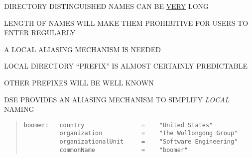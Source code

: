\begin{bwslide}

\begin{nrtc}
\item	DIRECTORY DISTINGUISHED NAMES CAN BE \underline{VERY} LONG
	\begin{nrtc}
	\item	LENGTH OF NAMES WILL MAKE THEM PROHIBITIVE FOR USERS TO ENTER REGULARLY
	\end{nrtc}
\item	A LOCAL ALIASING MECHANISM IS NEEDED
	\begin{nrtc}
	\item	LOCAL DIRECTORY ``PREFIX'' IS ALMOST CERTAINLY PREDICTABLE
	\item	OTHER PREFIXES WILL BE WELL KNOWN
	\item	DSE PROVIDES AN ALIASING MECHANISM TO SIMPLIFY {\em LOCAL} NAMING
	\end{nrtc}
\end{nrtc}
\end{bwslide}


\begin{bwslide}

\begin{quote}\smaller\begin{verbatim}
boomer:   country                =    "United States"
          organization           =    "The Wollongong Group"
          organizationalUnit     =    "Software Engineering"
          commonName             =    "boomer"
\end{verbatim}\end{quote}
\end{bwslide}


%



